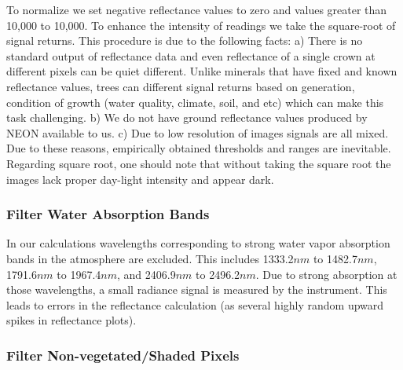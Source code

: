 \documentclass[remotesensing,article,accept,moreauthors,pdftex,12pt,a4paper]{mdpi}
\begin{document}
To normalize we set negative reflectance values to zero and values greater than 10,000 to 10,000. 
To enhance the intensity of readings we take the square-root of signal returns. 
This procedure is due to the following facts: 
a) There is no standard output of reflectance data and even reflectance of a single crown at different pixels can be quiet different.
 Unlike minerals that have fixed and known reflectance values, trees can different signal returns based on generation, condition of growth (water quality, climate, soil, and etc) which can make this task challenging. 
 b) We do not have ground reflectance values produced by NEON available to us. 
 c) Due to low resolution of images signals are all mixed. 
 Due to these reasons, empirically obtained thresholds and ranges are inevitable. 
 Regarding square root, one should note that without taking the square root the images lack proper day-light intensity and appear dark.

\subsubsection{Filter Water Absorption Bands}

In our calculations wavelengths corresponding to strong water vapor absorption bands in the atmosphere are excluded. 
This includes 1333.2$nm$ to 1482.7$nm$, 1791.6$n m$ to 1967.4$n m$, and 2406.9$n m$ to 2496.2$n m$. 
Due to strong absorption at those wavelengths, a small radiance signal is measured by the instrument. 
This leads to errors in the reflectance calculation (as several highly random upward spikes in reflectance plots). 

\subsubsection{Filter Non-vegetated/Shaded Pixels}
\end{document}
